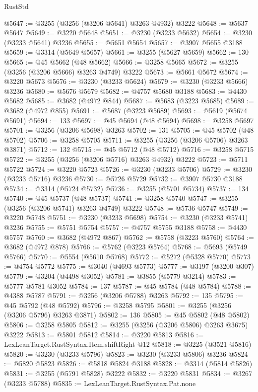 \begin{lexlean}{RustStd}
\begin{coremodule}
@5647 := @3255 (@3256 (@3206 @5641) @3263 @4932) @3222
@5648 := @5637 @5647
@5649 := @3220 @5648
@5651 := @3230 (@3233 @5632)
@5654 := @3230 (@3233 @5641) @3236
@5655 := @5651 @5654
@5657 := @3907 @5655 @3188
@5659 := @3314 (@5649 @5657)
@5661 := @3255 (@5627 @5659)
@5662 := 130
@5665 := @45 @5662 (@48 @5662)
@5666 := @3258 @5665
@5672 := @3255 (@3256 (@3206 @5666) @3263 @4749) @3222
@5673 := @5661 @5672
@5674 := @3220 @5673
@5676 := @3230 (@3233 @5624)
@5679 := @3230 (@3233 @5666) @3236
@5680 := @5676 @5679
@5682 := @4757 @5680 @3188
@5683 := @4430 @5682
@5685 := @3682 (@4972 @844)
@5687 := @5683 (@3223 @5685)
@5689 := @3682 (@4972 @855)
@5691 := @5687 (@3223 @5689)
@5693 := @5619 (@5674 @5691)
@5694 := 133
@5697 := @45 @5694 (@48 @5694)
@5698 := @3258 @5697
@5701 := @3256 (@3206 @5698) @3263
@5702 := 131
@5705 := @45 @5702 (@48 @5702)
@5706 := @3258 @5705
@5711 := @3255 (@3256 (@3206 @5706) @3263 @3871)
@5712 := 132
@5715 := @45 @5712 (@48 @5712)
@5716 := @3258 @5715
@5722 := @3255 (@3256 (@3206 @5716) @3263 @4932) @3222
@5723 := @5711 @5722
@5724 := @3220 @5723
@5726 := @3230 (@3233 @5706)
@5729 := @3230 (@3233 @5716) @3236
@5730 := @5726 @5729
@5732 := @3907 @5730 @3188
@5734 := @3314 (@5724 @5732)
@5736 := @3255 (@5701 @5734)
@5737 := 134
@5740 := @45 @5737 (@48 @5737)
@5741 := @3258 @5740
@5747 := @3255 (@3256 (@3206 @5741) @3263 @4749) @3222
@5748 := @5736 @5747
@5749 := @3220 @5748
@5751 := @3230 (@3233 @5698)
@5754 := @3230 (@3233 @5741) @3236
@5755 := @5751 @5754
@5757 := @4757 @5755 @3188
@5758 := @4430 @5757
@5760 := @3682 (@4972 @867)
@5762 := @5758 (@3223 @5760)
@5764 := @3682 (@4972 @878)
@5766 := @5762 (@3223 @5764)
@5768 := @5693 (@5749 @5766)
@5770 := @5554 (@5610 @5768)
@5772 := @5272 (@5328 @5770)
@5773 := @4754 @5772
@5775 := @3040 (@4693 @5773)
@5777 := @3197 (@3200 @307)
@5779 := @3204 (@4498 @3052)
@5781 := @3855 (@5779 @3214)
@5783 := @5777 @5781 @3052
@5784 := 137
@5787 := @45 @5784 (@48 @5784)
@5788 := @4388 @5787
@5791 := @3256 (@3206 @5788) @3263
@5792 := 135
@5795 := @45 @5792 (@48 @5792)
@5796 := @3258 @5795
@5801 := @3255 (@3256 (@3206 @5796) @3263 @3871)
@5802 := 136
@5805 := @45 @5802 (@48 @5802)
@5806 := @3258 @5805
@5812 := @3255 (@3256 (@3206 @5806) @3263 @3675) @3222
@5813 := @5801 @5812
@5814 := @3220 @5813
@5816 := LexLeanTarget.RustSyntax.Item.shiftRight @12
@5818 := @3225 (@3521 @5816)
@5820 := @3230 (@3233 @5796)
@5823 := @3230 (@3233 @5806) @3236
@5824 := @5820 @5823
@5826 := @5818 @5824 @3188
@5828 := @3314 (@5814 @5826)
@5831 := @3255 (@5791 @5828) @3222
@5832 := @3220 @5831
@5834 := @3267 (@3233 @5788)
@5835 := LexLeanTarget.RustSyntax.Pat.none

\end{coremodule}
\end{lexlean}
